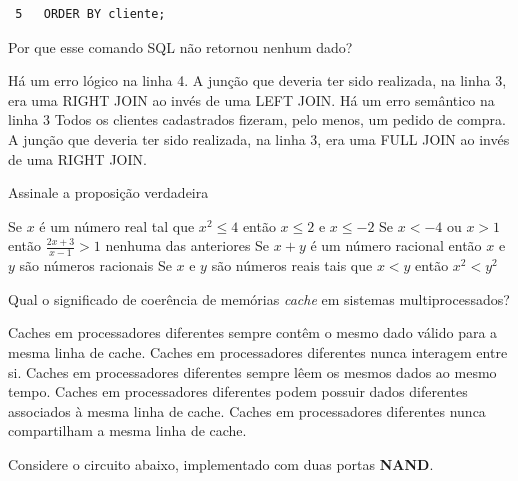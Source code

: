 \documentclass[12pt, addpoints]{exam}
\begin{document}
\begin{questions}
\begin{tcolorbox}
\begin{verbatim}
 5   ORDER BY cliente;

 \end{verbatim}

\end{tcolorbox}

Por que esse comando SQL não retornou nenhum dado?


\begin{choices}
\choice Há um erro lógico na linha 4.
\choice A junção que deveria ter sido realizada, na linha 3, era uma RIGHT JOIN ao invés de uma LEFT JOIN.
\choice Há um erro semântico na linha 3
\choice Todos os clientes cadastrados fizeram, pelo menos, um pedido de compra.
\choice A junção que deveria ter sido realizada, na linha 3, era uma FULL JOIN ao invés de uma RIGHT JOIN.
\end{choices}

\question

Assinale a proposição verdadeira


\begin{choices}
\choice Se \( x \) é um número real tal que \( x^2 \leq 4 \) então \( x \leq 2 \) e \( x \leq -2 \)
\choice Se \( x < -4 \) ou \( x > 1 \) então \( \frac{2x + 3}{x - 1} > 1 \)
\choice nenhuma das anteriores
\choice Se \( x + y \) é um número racional então \( x \) e \( y \) são números racionais
\choice Se \( x \) e \( y \) são números reais tais que \( x < y \) então \( x^2 < y^2 \)
\end{choices}

\question

Qual o significado de coerência de memórias \textit{cache} em sistemas multiprocessados?


\begin{choices}
\choice Caches em processadores diferentes sempre contêm o mesmo dado válido para a mesma linha de cache.
\choice Caches em processadores diferentes nunca interagem entre si.
\choice Caches em processadores diferentes sempre lêem os mesmos dados ao mesmo tempo.
\choice Caches em processadores diferentes podem possuir dados diferentes associados à mesma linha de cache.
\choice Caches em processadores diferentes nunca compartilham a mesma linha de cache.
\end{choices}

\question

Considere o circuito abaixo, implementado com duas portas \textbf{NAND}.



\begin{figure}[H]


\end{figure}
\end{questions}
\end{document}

